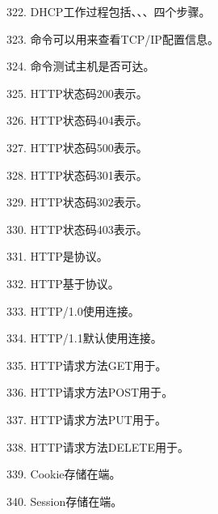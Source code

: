 322. DHCP工作过程包括\underline{\hspace{2cm}}、\underline{\hspace{2cm}}、\underline{\hspace{2cm}}、\underline{\hspace{2cm}}四个步骤。

323. \underline{\hspace{2cm}}命令可以用来查看TCP/IP配置信息。

324. \underline{\hspace{2cm}}命令测试主机是否可达。

325. HTTP状态码200表示\underline{\hspace{2cm}}。

326. HTTP状态码404表示\underline{\hspace{2cm}}。

327. HTTP状态码500表示\underline{\hspace{2cm}}。

328. HTTP状态码301表示\underline{\hspace{2cm}}。

329. HTTP状态码302表示\underline{\hspace{2cm}}。

330. HTTP状态码403表示\underline{\hspace{2cm}}。

331. HTTP是\underline{\hspace{2cm}}协议。

332. HTTP基于\underline{\hspace{2cm}}协议。

333. HTTP/1.0使用\underline{\hspace{2cm}}连接。

334. HTTP/1.1默认使用\underline{\hspace{2cm}}连接。

335. HTTP请求方法GET用于\underline{\hspace{2cm}}。

336. HTTP请求方法POST用于\underline{\hspace{2cm}}。

337. HTTP请求方法PUT用于\underline{\hspace{2cm}}。

338. HTTP请求方法DELETE用于\underline{\hspace{2cm}}。

339. Cookie存储在\underline{\hspace{2cm}}端。

340. Session存储在\underline{\hspace{2cm}}端。

